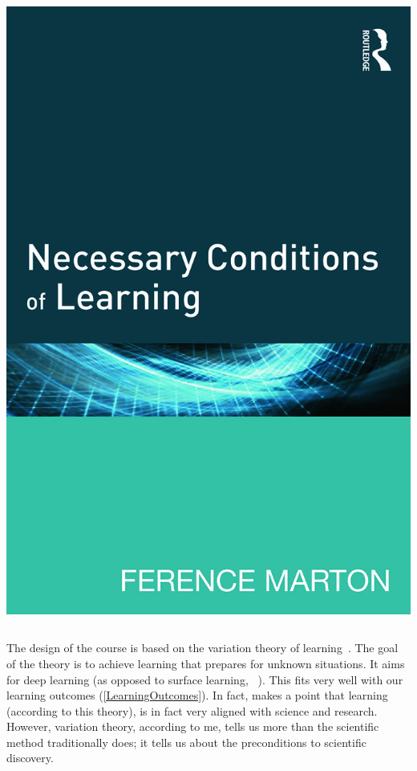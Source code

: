 \begin{frame}
\begin{remark}
\begin{columns}[T]
\begin{column}{0.4\columnwidth}
          \includegraphics[height=0.55\textheight]{figs/NCOL.jpg}
        \end{column}
      \end{columns}
  \end{remark}
\end{frame}

The design of the course is based on the variation theory of learning~\cite[see 
\eg][]{NecessaryConditionsOfLearning}.
The goal of the theory is to achieve learning that prepares for unknown 
situations.
It aims for deep learning (as opposed to surface learning, 
\cf~\cite{DeepSurfaceLearning}).
This fits very well with our learning outcomes (\cref{LearningOutcomes}).
In fact, \textcite{NecessaryConditionsOfLearning} makes a point that learning 
(according to this theory), is in fact very aligned with science and research.
However, variation theory, according to me, tells us more than the scientific 
method traditionally does; it tells us about the preconditions to scientific 
discovery.

